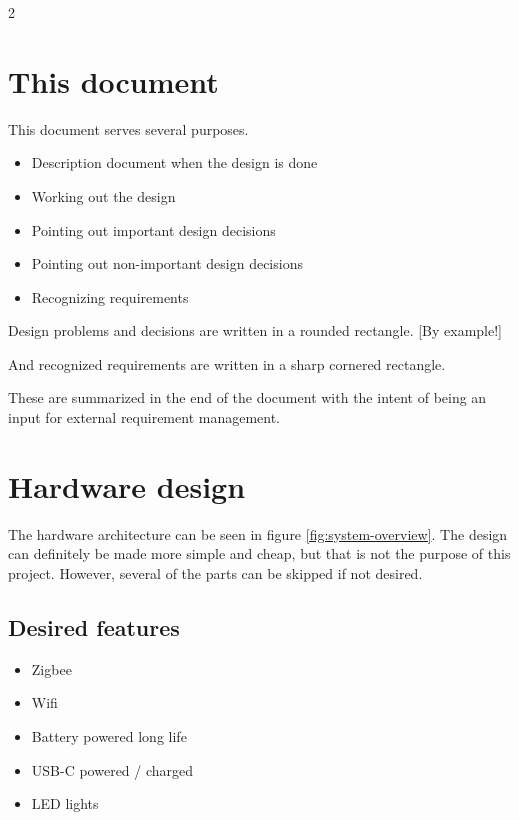 \documentclass[11px]{specification}
\begin{document}
\begin{multicols}{2}
\newpage

\section{This document}
This document serves several purposes.
\begin{itemize}
    \item Description document when the design is done
    \item Working out the design
    \item Pointing out important design decisions
    \item Pointing out non-important design decisions
    \item Recognizing requirements
\end{itemize}

Design problems and decisions are written in a rounded rectangle.
[By example!]

And recognized requirements are written in a sharp cornered rectangle.

These are summarized in the end of the document with the intent of being an input for external requirement management.

\newpage

\section{Hardware design}

The hardware architecture can be seen in figure \ref{fig:system-overview}. The design can definitely be made more simple and cheap, but that is not the purpose of this project. However, several of the parts can be skipped if not desired.

\subsection{Desired features}

\begin{itemize}
    \item{Zigbee}
    \item{Wifi}
    \item{Battery powered long life}
    \item{USB-C powered / charged}
    \item{LED lights}
\end{itemize}


\end{multicols}
\end{document}
